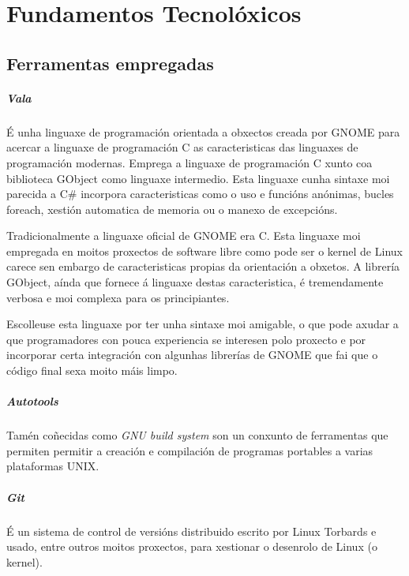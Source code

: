 \chapter{Fundamentos Tecnolóxicos}

\section{Ferramentas empregadas}

\paragraph{Vala} É unha linguaxe de programación orientada a obxectos creada por GNOME para acercar a linguaxe de programación C as caracteristicas das linguaxes de programación modernas. Emprega a linguaxe de programación C xunto coa biblioteca GObject como linguaxe intermedio. Esta linguaxe cunha sintaxe moi parecida a C\# incorpora caracteristicas como o uso e funcións anónimas, bucles foreach, xestión automatica de memoria ou o manexo de excepcións.

Tradicionalmente a linguaxe oficial de GNOME era C. Esta linguaxe moi empregada en moitos proxectos de software libre como pode ser o kernel de Linux carece sen embargo de caracteristicas propias da orientación a obxetos. A librería GObject, aínda que fornece á linguaxe destas caracteristica, é tremendamente verbosa e moi complexa para os principiantes.

Escolleuse esta linguaxe por ter unha sintaxe moi amigable, o que pode axudar a que programadores con pouca experiencia se interesen polo proxecto e por incorporar certa integración con algunhas librerías de GNOME que fai que o código final sexa moito máis limpo.

 \paragraph{Autotools} Tamén coñecidas como \emph{GNU build system} son un conxunto de ferramentas que permiten permitir a creación e compilación de programas portables a varias plataformas UNIX.

 \paragraph{Git} É un sistema de control de versións distribuido escrito por Linux Torbards e usado, entre outros moitos proxectos, para xestionar o desenrolo de Linux (o kernel).

